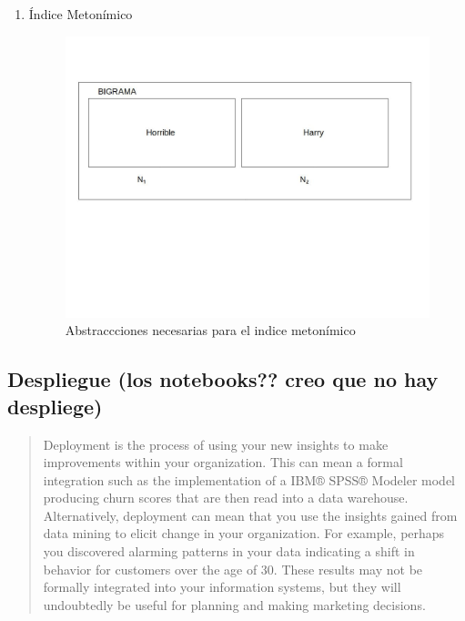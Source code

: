 \documentclass[twoside]{article}
\begin{document}
\begin{enumerate}
\item Índice Metonímico
\label{sec:orged382fc}
\begin{figure}[htbp]
\centering
\includegraphics[width=.9\linewidth]{./assets/metonimia.jpg}
\caption{Abstraccciones necesarias para el indice metonímico}
\end{figure}
\end{enumerate}

\subsection{Despliegue (los notebooks?? creo que no hay despliege)}
\label{sec:orge6d6796}

\begin{quote}
Deployment is the process of using your new insights to make
improvements within your organization. This can mean a formal
integration such as the implementation of a IBM® SPSS® Modeler model
producing churn scores that are then read into a data
warehouse. Alternatively, deployment can mean that you use the
insights gained from data mining to elicit change in your
organization. For example, perhaps you discovered alarming patterns in
your data indicating a shift in behavior for customers over the age
of 30. These results may not be formally integrated into your
information systems, but they will undoubtedly be useful for planning
and making marketing decisions.
\end{quote}
\end{document}
